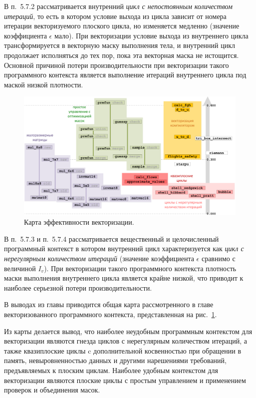 \documentclass[a4paper,14pt]{extarticle}                     %
\theoremstyle{plain}                                         %
\begin{document}
В п.~5.7.2 рассматривается внутренний \textit{цикл с непостоянным количеством итераций}, то есть в котором условие выхода из цикла зависит от номера итерации векторизуемого плоского цикла, но изменяется медленно (значение коэффициента $\epsilon$ мало).
При векторизации условие выхода из внутреннего цикла трансформируется в векторную маску выполнения тела, и внутренний цикл продолжает исполняться до тех пор, пока эта векторная маска не истощится.
Основной причиной потери производительности при векторизации такого программного контекста является выполнение итераций внутреннего цикла под маской низкой плотности.

\begin{figure}[!ht]
\centering
\includegraphics[width=1.0\textwidth]{./fig/vec_fin_map.pdf}
\singlespacing
\caption{Карта эффективности векторизации.}
\label{fig:vec_fin_map}
\end{figure}

В п.~5.7.3 и п.~5.7.4 рассматривается вещественный и целочисленный программный контекст в котором внутренний цикл характеризуется как \textit{цикл с нерегулярным количеством итераций} (значение коэффициента $\epsilon$ сравнимо с величиной $I_v$).
При векторизации такого программного контекста плотность маски выполнения внутреннего цикла является крайне низкой, что приводит к наиболее серьезной потери производительности. 


В выводах из главы приводится общая карта рассмотренного в главе векторизованного программного контекста, представленная на рис.~\ref{fig:vec_fin_map}.

Из карты делается вывод, что наиболее неудобным программным контекстом для векторизации являются гнезда циклов с нерегулярным количеством итераций, а также квазиплоские циклы c дополнительной косвенностью при обращении в память, невыровненностью данных и другими нарешениями требований, предъявляемых к плоским циклам.
Наиболее удобным контекстом для векторизации являются плоские циклы с простым управлением и применением проверок и объединения масок.
\end{document}
